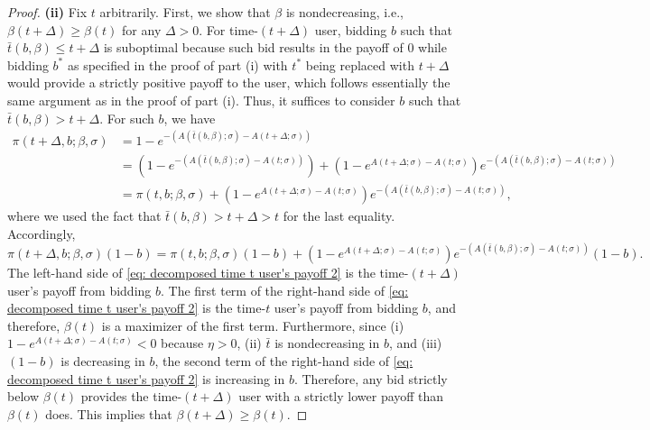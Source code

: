 \documentclass[12pt, letterpaper]{article}
\begin{document}
\begin{proof}
\textbf{(ii)} Fix $t$ arbitrarily. First, we show that $\beta$ is nondecreasing, i.e., $\beta(t + \Delta) \ge \beta(t)$ for any $\Delta > 0$. For time-$(t + \Delta)$ user, bidding $b$ such that $\bar{t}(b, \beta) \le t + \Delta$ is suboptimal because such bid results in the payoff of 0 while bidding $b^*$ as specified in the proof of part (i) with $t^*$ being replaced with $t+\Delta$ would provide a strictly positive payoff to the user, which follows essentially the same argument as in the proof of part (i). Thus, it suffices to consider $b$ such that $\bar{t}(b, \beta) > t + \Delta$. For such $b$, we have
\begin{align}
    \pi(t + \Delta, b; \beta, \sigma) & = 1 - e^{- (A(\bar{t}(b, \beta); \sigma) - A(t + \Delta; \sigma))} \\
    & = (1-e^{-(A(\bar{t}(b,\beta); \sigma)-A(t; \sigma))})+(1-e^{A(t+\Delta; \sigma)-A(t; \sigma)})e^{-(A(\bar{t}(b,\beta); \sigma)-A(t; \sigma))}\\
    & = \pi(t, b; \beta, \sigma) + (1-e^{A(t+\Delta; \sigma)-A(t; \sigma)})e^{-(A(\bar{t}(b,\beta); \sigma)-A(t; \sigma))},
\end{align}
where we used the fact that $\bar{t}(b, \beta) > t + \Delta > t$ for the last equality.
Accordingly,
\begin{equation}
        \pi(t + \Delta, b; \beta, \sigma)(1 - b) = \pi(t, b; \beta, \sigma)(1 - b) + (1-e^{A(t+\Delta; \sigma)-A(t; \sigma)})e^{-(A(\bar{t}(b,\beta); \sigma)-A(t; \sigma))}(1 - b).\label{eq: decomposed time t user's payoff 2}
\end{equation}
The left-hand side of \eqref{eq: decomposed time t user's payoff 2} is the time-$(t + \Delta)$ user's payoff from bidding $b$. The first term of the right-hand side of \eqref{eq: decomposed time t user's payoff 2} is the time-$t$ user's payoff from bidding $b$, and therefore, $\beta(t)$ is a maximizer of the first term. Furthermore, since (i) $1-e^{A(t+\Delta; \sigma)-A(t; \sigma)} < 0$ because $\eta>0$, (ii) $\bar{t}$ is nondecreasing in $b$, and (iii) $(1 - b)$ is decreasing in $b$, the second term of the right-hand side of \eqref{eq: decomposed time t user's payoff 2} is increasing in $b$. Therefore, any bid strictly below $\beta(t)$ provides the time-$(t+\Delta)$ user with a strictly lower payoff than $\beta(t)$ does. This implies that $\beta(t + \Delta) \ge \beta(t)$.



\end{proof}
\end{document}
